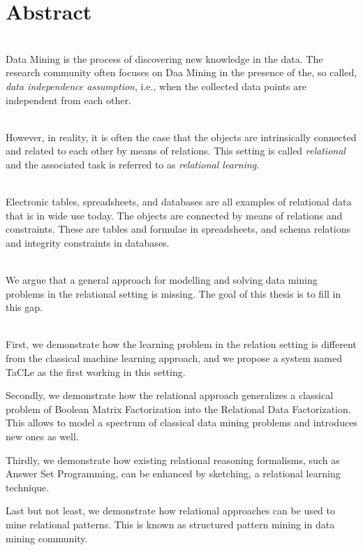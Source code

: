 \chapter{Abstract} \label{ch:abstract}
\\
Data Mining is the process of discovering new knowledge in the data.
The research community often focuses on Daa Mining 
in the presence of the, so called, \textit{data independence assumption}, i.e.,
when the collected data points are independent from each other.

\\
However, in reality, it is often the case that the objects are 
intrinsically connected and related to each other by means of relations. 
This setting is called \textit{relational} and the associated task 
is referred to as \textit{relational learning}.

\\
Electronic tables, spreadsheets, and databases are all examples of
relational data that is in wide use today. The objects are connected
by means of relations and constraints. These are
tables and formulae in spreadsheets, and  schema relations and integrity
constraints in databases.

\\
We argue that a general approach for modelling and solving data mining  
problems in the relational setting is missing. The goal of this thesis
is to fill in this gap.


\\
First, we demonstrate how the learning problem in the relation
setting is different from the classical machine learning approach, and we
propose a system named TaCLe as the first working in this setting.

Secondly, we demonstrate how the relational approach generalizes a
classical problem of Boolean Matrix Factorization into the Relational
Data Factorization. This allows to model a spectrum of classical data
mining problems and introduces new ones as well.

Thirdly, we demonstrate how existing relational reasoning formalisms,
such as Answer Set Programming, can be enhanced by sketching, a relational learning
technique.

Last but not least, we demonstrate how relational approaches can be used
to mine relational patterns. This is known as structured pattern mining in
data mining community.


\cleardoublepage


